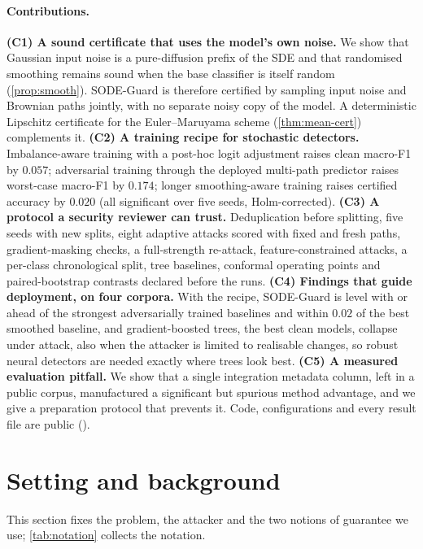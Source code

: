 \paragraph{Contributions.}
\textbf{(C1) A sound certificate that uses the model's own noise.} We show that
Gaussian input noise is a pure-diffusion prefix of the SDE and that randomised
smoothing remains sound when the base classifier is itself random
(\cref{prop:smooth}). SODE-Guard is therefore certified by sampling input noise
and Brownian paths jointly, with no separate noisy copy of the model. A
deterministic Lipschitz certificate for the Euler--Maruyama scheme
(\cref{thm:mean-cert}) complements it.
\textbf{(C2) A training recipe for stochastic detectors.} Imbalance-aware
training with a post-hoc logit adjustment raises clean macro-F1 by $0.057$;
adversarial training through the deployed multi-path predictor raises
worst-case macro-F1 by $0.174$; longer smoothing-aware training raises
certified accuracy by $0.020$ (all significant over five seeds, Holm-corrected).
\textbf{(C3) A protocol a security reviewer can trust.} Deduplication before
splitting, five seeds with new splits, eight adaptive attacks scored with
fixed and fresh paths, gradient-masking checks, a full-strength re-attack,
feature-constrained attacks, a per-class chronological split, tree baselines,
conformal operating points and paired-bootstrap contrasts declared before the
runs.
\textbf{(C4) Findings that guide deployment, on four corpora.} With the recipe,
SODE-Guard is level with or ahead of the strongest adversarially trained
baselines and within $0.02$ of the best smoothed baseline, and
gradient-boosted trees, the best clean models, collapse under attack, also when
the attacker is limited to realisable changes, so robust neural detectors are
needed exactly where trees look best.
\textbf{(C5) A measured evaluation pitfall.} We show that a single integration
metadata column, left in a public corpus, manufactured a significant but
spurious method advantage, and we give a preparation protocol that prevents it.
Code, configurations and every result file are public (\coderepo).

\section{Setting and background}\label{sec:setting}
This section fixes the problem, the attacker and the two notions of
guarantee we use; \cref{tab:notation} collects the notation.

